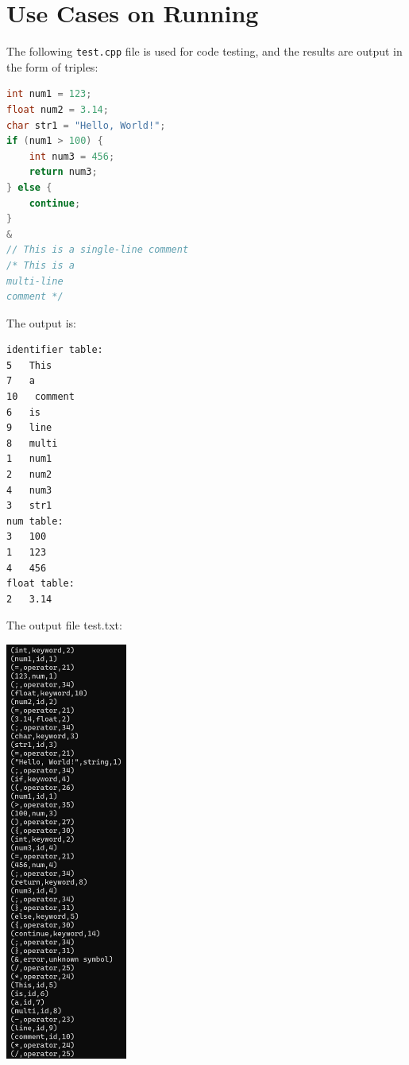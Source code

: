 \documentclass[a4paper,12pt]{article}
\begin{document}
\section{Use Cases on Running}
        The following \texttt{test.cpp} file is used for code testing, and the results are output in the form of triples:
        \begin{lstlisting}[language=c++]
int num1 = 123;
float num2 = 3.14;
char str1 = "Hello, World!";
if (num1 > 100) {
    int num3 = 456;
    return num3;
} else {
    continue;
}
&
// This is a single-line comment
/* This is a
multi-line
comment */
        \end{lstlisting}
        The output is:
        
        \begin{lstlisting}
identifier table:
5   This
7   a
10   comment
6   is
9   line
8   multi
1   num1
2   num2
4   num3
3   str1
num table:
3   100
1   123
4   456
float table:
2   3.14
        \end{lstlisting}
The output file test.txt:

\vspace{10pt}
\centerline{\includegraphics[width=0.3\textwidth]{photo/2.png}}
\vspace{10pt}
\end{document}
